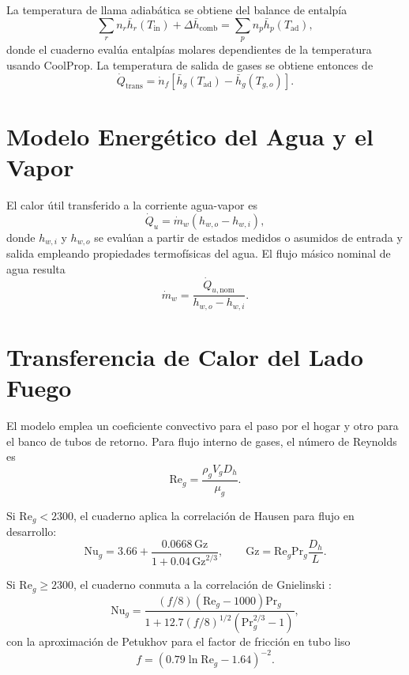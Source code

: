 \documentclass[conference]{IEEEtran}
\begin{document}
La temperatura de llama adiab\'atica se obtiene del balance de entalp\'ia
\begin{equation}
\sum_{r} n_r \bar{h}_r(T_{\mathrm{in}})
+ \Delta \bar{h}_{\mathrm{comb}}
=
\sum_{p} n_p \bar{h}_p(T_{\mathrm{ad}}),
\label{eq:tad}
\end{equation}
donde el cuaderno eval\'ua entalp\'ias molares dependientes de la temperatura usando CoolProp. La temperatura de salida de gases se obtiene entonces de
\begin{equation}
\dot{Q}_{\mathrm{trans}}
=
\dot{n}_f
\left[
\bar{h}_{g}(T_{\mathrm{ad}})
-\bar{h}_{g}(T_{g,o})
\right].
\label{eq:tgout}
\end{equation}

\section{Modelo Energ\'etico del Agua y el Vapor}
El calor \'util transferido a la corriente agua-vapor es
\begin{equation}
\dot{Q}_u=\dot{m}_w\left(h_{w,o}-h_{w,i}\right),
\label{eq:qwater}
\end{equation}
donde $h_{w,i}$ y $h_{w,o}$ se eval\'uan a partir de estados medidos o asumidos de entrada y salida empleando propiedades termof\'isicas del agua. El flujo m\'asico nominal de agua resulta
\begin{equation}
\dot{m}_w=\frac{\dot{Q}_{u,\mathrm{nom}}}{h_{w,o}-h_{w,i}}.
\label{eq:mw}
\end{equation}

\section{Transferencia de Calor del Lado Fuego}
El modelo emplea un coeficiente convectivo para el paso por el hogar y otro para el banco de tubos de retorno. Para flujo interno de gases, el n\'umero de Reynolds es
\begin{equation}
\mathrm{Re}_g = \frac{\rho_g V_g D_h}{\mu_g}.
\label{eq:re}
\end{equation}

Si $\mathrm{Re}_g<2300$, el cuaderno aplica la correlaci\'on de Hausen para flujo en desarrollo:
\begin{equation}
\mathrm{Nu}_g =
3.66 + \frac{0.0668\,\mathrm{Gz}}{1+0.04\,\mathrm{Gz}^{2/3}},
\qquad
\mathrm{Gz}=\mathrm{Re}_g\mathrm{Pr}_g\frac{D_h}{L}.
\label{eq:hausen}
\end{equation}

Si $\mathrm{Re}_g\geq2300$, el cuaderno conmuta a la correlaci\'on de Gnielinski \cite{gnielinski1976}:
\begin{equation}
\mathrm{Nu}_g =
\frac{\left(f/8\right)\left(\mathrm{Re}_g-1000\right)\mathrm{Pr}_g}
{1+12.7\left(f/8\right)^{1/2}\left(\mathrm{Pr}_g^{2/3}-1\right)},
\label{eq:gnielinski}
\end{equation}
con la aproximaci\'on de Petukhov para el factor de fricci\'on en tubo liso
\begin{equation}
f=\left(0.79\ln\mathrm{Re}_g-1.64\right)^{-2}.
\label{eq:petukhov}
\end{equation}
\end{document}
